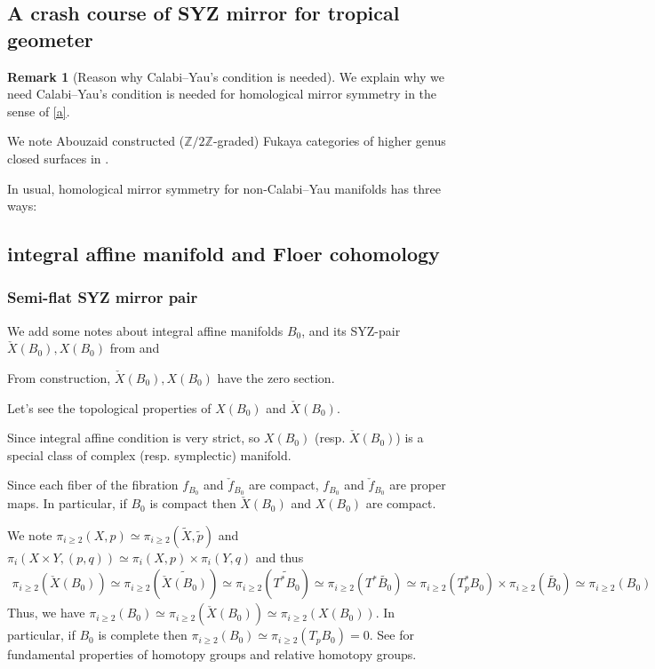 \documentclass[a4paper,dvipdfmx,reqno,12pt]{amsart}
\theoremstyle{definition}
\newtheorem{Rmk}[Thm]{Remark}
\newcommand{\Z}{\mathbb{Z}}%
\numberwithin{equation}{section}
\begin{document}
\subsection{A crash course of SYZ mirror for tropical 
geometer}

\begin{Rmk}[{Reason why Calabi--Yau's condition is needed}]

We explain why we need Calabi--Yau's condition is needed for
homological mirror symmetry in the sense of \cref{a}.

We note Abouzaid constructed ($\Z/2\Z$-graded)
Fukaya categories of higher genus closed surfaces in
\cite{MR2383898}. 
\end{Rmk}

In usual, homological mirror symmetry 
for non-Calabi--Yau manifolds has three ways:



\subsection{integral affine manifold and Floer cohomology}

\subsubsection{Semi-flat SYZ mirror pair}

We add some notes about integral affine manifolds $B_0$, and its SYZ-pair $\check{X}(B_0), X(B_0)$ from \cite[Chapter 6]{aspinwallDirichletBranesMirror2009} and \cite{MR2737696,MR3079343}



From construction, $\check{X}(B_0), X(B_0)$ have the zero section.

Let's see the topological properties of $X(B_0)$ and $\check{X}(B_0)$.

Since integral affine condition is very strict, so $X(B_0)$ (resp. $\check{X}(B_0)$) is a special class of complex (resp. symplectic) manifold.

Since each fiber of the fibration $f_{B_0}$ and $\check{f}_{B_0}$ are compact, $f_{B_0}$ and $\check{f}_{B_0}$ are proper maps. In particular, if $B_0$ is compact then $\check{X}(B_0)$ and $X(B_0)$ are compact.



We note $\pi_{i\geq 2}(X,p)\simeq \pi_{i\geq 2}(\widetilde{X},\tilde{p})$ and $\pi_{i}(X\times Y,(p,q))\simeq \pi_i(X,p)\times \pi_i(Y,q)$ and thus
\begin{align}
  \pi_{i\geq 2}(\check{X}(B_0))\simeq \pi_{i\geq 2}(\widetilde{\check{X}(B_0)})\simeq \pi_{i\geq 2}(\widetilde{T^{*}B_0})\simeq \pi_{i\geq 2}(T^{*}\widetilde{B_0})\simeq  \pi_{i\geq 2}(T_p^* B_0)\times \pi_{i\geq 2}(\widetilde{B_0})\simeq \pi_{i\geq 2}(B_0)
\end{align}
Thus, we have $\pi_{i\geq 2}(B_0)\simeq \pi_{i\geq 2}(\check{X}(B_0))\simeq \pi_{i\geq 2}(X(B_0))$. In particular, if $B_0$ is complete then $\pi_{i\geq 2}(B_0)\simeq \pi_{i\geq 2}(T_{p}B_0)=0$. See \cite[Chapter 4]{hatcherAlgebraicTopology2002a} for fundamental properties of homotopy groups and relative homotopy groups.
\end{document}
